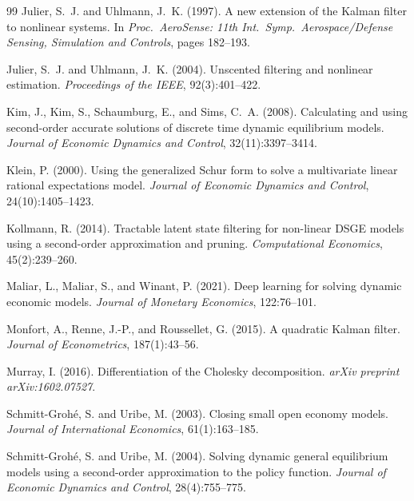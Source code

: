 \documentclass[12pt,a4paper]{article}
\begin{document}
\begin{thebibliography}{99}
Julier, S.~J. and Uhlmann, J.~K. (1997).
\newblock A new extension of the {Kalman} filter to nonlinear systems.
\newblock In \emph{Proc.\ AeroSense: 11th Int.\ Symp.\ Aerospace/Defense
  Sensing, Simulation and Controls}, pages 182--193.

Julier, S.~J. and Uhlmann, J.~K. (2004).
\newblock Unscented filtering and nonlinear estimation.
\newblock \emph{Proceedings of the IEEE}, 92(3):401--422.

Kim, J., Kim, S., Schaumburg, E., and Sims, C.~A. (2008).
\newblock Calculating and using second-order accurate solutions of discrete
  time dynamic equilibrium models.
\newblock \emph{Journal of Economic Dynamics and Control},
  32(11):3397--3414.

Klein, P. (2000).
\newblock Using the generalized {Schur} form to solve a multivariate linear
  rational expectations model.
\newblock \emph{Journal of Economic Dynamics and Control},
  24(10):1405--1423.

Kollmann, R. (2014).
\newblock Tractable latent state filtering for non-linear {DSGE} models using
  a second-order approximation and pruning.
\newblock \emph{Computational Economics}, 45(2):239--260.

Maliar, L., Maliar, S., and Winant, P. (2021).
\newblock Deep learning for solving dynamic economic models.
\newblock \emph{Journal of Monetary Economics}, 122:76--101.

Monfort, A., Renne, J.-P., and Roussellet, G. (2015).
\newblock A quadratic {Kalman} filter.
\newblock \emph{Journal of Econometrics}, 187(1):43--56.

Murray, I. (2016).
\newblock Differentiation of the {Cholesky} decomposition.
\newblock \emph{arXiv preprint arXiv:1602.07527}.

Schmitt-Groh{\'e}, S. and Uribe, M. (2003).
\newblock Closing small open economy models.
\newblock \emph{Journal of International Economics}, 61(1):163--185.

Schmitt-Groh{\'e}, S. and Uribe, M. (2004).
\newblock Solving dynamic general equilibrium models using a second-order
  approximation to the policy function.
\newblock \emph{Journal of Economic Dynamics and Control},
  28(4):755--775.


\end{thebibliography}
\end{document}
